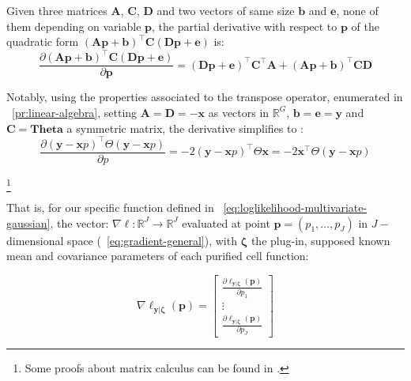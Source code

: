\documentclass[long, final]{jobim}
\newcommand \RR {\mathbb{R}}
\begin{document}
\begin{property}
Given three matrices $\boldsymbol{A}$, $\boldsymbol{C}$, $\boldsymbol{D}$ and two vectors of same size $\boldsymbol{b}$ and $\boldsymbol{e}$, none of them depending on variable $\boldsymbol{p}$, the partial derivative with respect to $\boldsymbol{p}$ of the quadratic form $(\boldsymbol{A} \boldsymbol{p} + \boldsymbol{b})^\top \boldsymbol{C} (\boldsymbol{D} \boldsymbol{p} + \boldsymbol{e})$ is:
\begin{equation*}
    \frac{\partial (\boldsymbol{A} \boldsymbol{p} + \boldsymbol{b})^\top \boldsymbol{C} (\boldsymbol{D} \boldsymbol{p} + \boldsymbol{e})}{\partial \boldsymbol{p}} = (\boldsymbol{D} \boldsymbol{p} + \boldsymbol{e})^\top \boldsymbol{C}^\top \boldsymbol{A} + (\boldsymbol{A} \boldsymbol{p} + \boldsymbol{b})^\top \boldsymbol{C} \boldsymbol{D}
\end{equation*}

Notably, using the properties associated to the transpose operator, enumerated in \propertyname~\ref{pr:linear-algebra}, setting $\boldsymbol{A} = \boldsymbol{D} = - \boldsymbol{x}$ as vectors in $\RR^G$,  $\boldsymbol{b} = \boldsymbol{e} = \boldsymbol{y}$ and $\boldsymbol{C}= \boldsymbol{Theta}$ a symmetric matrix, the derivative simplifies to :
\begin{equation*}
    \frac{\partial (\boldsymbol{y} - \boldsymbol{x} p)^\top \Theta (\boldsymbol{y} - \boldsymbol{x} p)}{\partial p} = -2  (\boldsymbol{y} - \boldsymbol{x} p)^\top \Theta \boldsymbol{x} = -2 \boldsymbol{x}^\top \Theta (\boldsymbol{y} - \boldsymbol{x} p)
\end{equation*}

\footnote{Some proofs about matrix calculus can be found in \cite{kaare12}.}
\end{property}


That is, for our specific function defined in \equationname~\ref{eq:loglikelihood-multivariate-gaussian}, the vector: $\nabla \ell: \RR^J \to \RR^J$ evaluated at point $\boldsymbol{p}=(p_1, \ldots, p_J)$ in $J-$dimensional space (\equationname~\ref{eq:gradient-general}), with $\boldsymbol{\zeta}$ the plug-in, supposed known mean and covariance parameters of each purified cell function: 

\begin{equation}
\label{eq:gradient-general}
\nabla\ell_{\boldsymbol{y} | \boldsymbol{\zeta}} (\boldsymbol{p})=
\begin{bmatrix}
\frac{\partial \ell_{\boldsymbol{y} | \boldsymbol{\zeta}} (\boldsymbol{p})}{\partial p_1} \\
\vdots \\
\frac{\partial \ell_{\boldsymbol{y} | \boldsymbol{\zeta}}(\boldsymbol{p})}{\partial p_J}
\end{bmatrix}
\end{equation}
\end{document}
